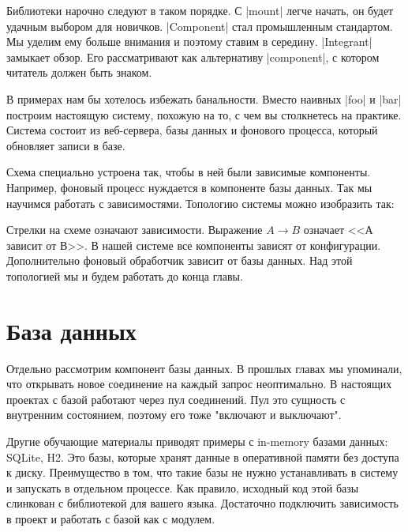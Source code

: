 Библиотеки нарочно следуют в таком порядке. С \spverb|mount| легче начать, он
будет удачным выбором для новичков. \spverb|Component| стал промышленным
стандартом. Мы уделим ему больше внимания и поэтому ставим в
середину. \spverb|Integrant| замыкает обзор. Его рассматривают как альтернативу
\spverb|component|, с котором читатель должен быть знаком.

В примерах нам бы хотелось избежать банальности. Вместо наивных \spverb|foo| и
\spverb|bar| построим настоящую систему, похожую на то, с чем вы столкнетесь на
практике. Система состоит из веб-сервера, базы данных и фонового процесса,
который обновляет записи в базе.


Схема специально устроена так, чтобы в ней были зависимые компоненты. Например,
фоновый процесс нуждается в компоненте базы данных. Так мы научимся работать с
зависимостями. Топологию системы можно изобразить так:


Стрелки на схеме означают зависимости. Выражение $A \to B$ означает <<А зависит
от В>>. В нашей системе все компоненты зависят от конфигурации. Дополнительно
фоновый обработчик зависит от базы данных. Над этой топологией мы и будем
работать до конца главы.

\section{База данных}

Отдельно рассмотрим компонент базы данных. В прошлых главах мы упоминали, что
открывать новое соединение на каждый запрос неоптимально. В настоящих проектах с
базой работают через пул соединений. Пул это сущность с внутренним состоянием,
поэтому его тоже "включают и выключают".

Другие обучающие материалы приводят примеры с in-memory базами данных: SQLite,
H2. Это базы, которые хранят данные в оперативной памяти без доступа к
диску. Преимущество в том, что такие базы не нужно устанавливать в систему и
запускать в отдельном процессе. Как правило, исходный код этой базы слинкован с
библиотекой для вашего языка. Достаточно подключить зависимость в проект и
работать с базой как с модулем.

